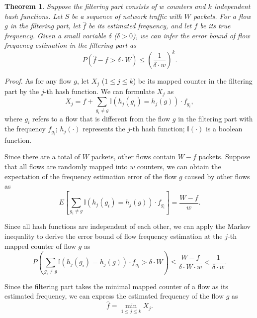 \documentclass[preprint,12pt]{elsarticle}
\newtheorem{theorem}{Theorem}
\begin{document}
\begin{theorem}
Suppose the filtering part consists of $w$ counters and $k$ independent hash functions. Let $S$ be a sequence of network traffic with $W$ packets. For a flow $g$ in the filtering part, let $\hat{f}$ be its estimated frequency, and let $f$ be its true frequency. Given a small variable $\delta$ ($\delta > 0$), we can infer the error bound of flow frequency estimation in the filtering part as
\begin{equation}
    P(\hat{f} - f > \delta \cdot W) \le \left(\frac{1}{\delta \cdot w}\right)^k.
\end{equation}
\end{theorem}

\textit{Proof.} As for any flow $g$, let $X_j$ ($1 \le j \le k$) be its mapped counter in the filtering part by the $j$-th hash function. We can formulate $X_j$ as
\begin{equation}
    X_j = f + \sum_{g_i \ne g} \mathbb{I}(h_j(g_i) = h_j(g)) \cdot f_{g_i},
\end{equation}
where $g_i$ refers to a flow that is different from the flow $g$ in the filtering part with the frequency $f_{g_i}$; $h_j(\cdot)$ represents the $j$-th hash function; $\mathbb{I}(\cdot)$ is a boolean function.

Since there are a total of $W$ packets, other flows contain $W - f$ packets. Suppose that all flows are randomly mapped into $w$ counters, we can obtain the expectation of the frequency estimation error of the flow $g$ caused by other flows as
\begin{equation}
    E\left[\sum_{g_i \ne g} \mathbb{I}(h_j(g_i) = h_j(g)) \cdot f_{g_i}\right] = \frac{W - f}{w}.
\end{equation}

Since all hash functions are independent of each other, we can apply the Markov inequality to derive the error bound of flow frequency estimation at the $j$-th mapped counter of flow $g$ as
\begin{equation}
    P\left(\sum_{g_i \ne g} \mathbb{I}(h_j(g_i) = h_j(g)) \cdot f_{g_i} > \delta \cdot W\right) \le \frac{W - f}{\delta \cdot W \cdot w} < \frac{1}{\delta \cdot w}.
\end{equation}

Since the filtering part takes the minimal mapped counter of a flow as its estimated frequency, we can express the estimated frequency of the flow $g$ as
\begin{equation}
    \hat{f} = \min_{1 \le j \le k} X_j.
\end{equation}
\end{document}

